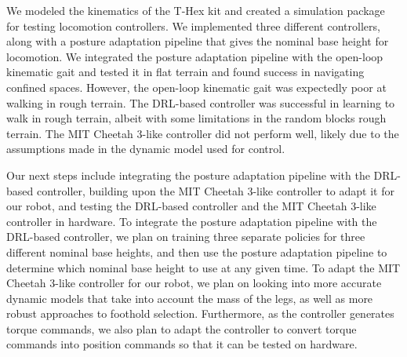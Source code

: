 We modeled the kinematics of the T-Hex kit and created a simulation package for testing locomotion controllers. We implemented three different controllers, along with a posture adaptation pipeline that gives the nominal base height for locomotion. We integrated the posture adaptation pipeline with the open-loop kinematic gait and tested it in flat terrain and found success in navigating confined spaces. However, the open-loop kinematic gait was expectedly poor at walking in rough terrain. The DRL-based controller was successful in learning to walk in rough terrain, albeit with some limitations in the random blocks rough terrain. The MIT Cheetah 3-like controller did not perform well, likely due to the assumptions made in the dynamic model used for control. 

Our next steps include integrating the posture adaptation pipeline with the DRL-based controller, building upon the MIT Cheetah 3-like controller to adapt it for our robot, and testing the DRL-based controller and the MIT Cheetah 3-like controller in hardware. To integrate the posture adaptation pipeline with the DRL-based controller, we plan on training three separate policies for three different nominal base heights, and then use the posture adaptation pipeline to determine which nominal base height to use at any given time. To adapt the MIT Cheetah 3-like controller for our robot, we plan on looking into more accurate dynamic models that take into account the mass of the legs, as well as more robust approaches to foothold selection. Furthermore, as the controller generates torque commands, we also plan to adapt the controller to convert torque commands into position commands \cite{zepedaTheoreticalConversionTorque2024,delpreteImplementingTorqueControl2016,khatibTorquepositionTransformerTask2008} so that it can be tested on hardware.